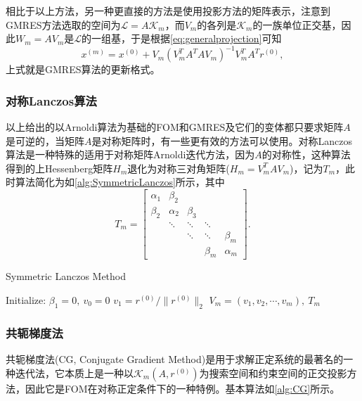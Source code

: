 \documentclass[a4paper,10pt]{ctexart}
\begin{document}
相比于以上方法，另一种更直接的方法是使用投影方法的矩阵表示，注意到GMRES方法选取的空间为$ \mathcal{L} = A \mathcal{K}_m $，而$ V_m $的各列是$ \mathcal{K}_m $的一族单位正交基，因此$ W_m = AV_m $是$ \mathcal{L} $的一组基，于是根据\ref{eq:generalprojection}可知
\begin{equation}
    x^{(m)} = x^{(0)} + V_m(V_m^TA^TAV_m)^{-1}V_m^TA^Tr^{(0)},
\end{equation}
上式就是GMRES算法的更新格式。

\subsubsection{对称Lanczos算法}
以上给出的以Arnoldi算法为基础的FOM和GMRES及它们的变体都只要求矩阵$ A $是可逆的，当矩阵$ A $是对称矩阵时，有一些更有效的方法可以使用。对称Lanczos算法是一种特殊的适用于对称矩阵Arnoldi迭代方法，因为$ A $的对称性，这种算法得到的上Hessenberg矩阵$ H_m $退化为对称三对角矩阵($ H_m = V^T_mAV_m $)，记为$ T_m $，此时算法简化为如\ref{alg:SymmetricLanczos}所示，其中
\[
    T_m = 
    \begin{bmatrix} 
        \alpha_1 & \beta_2 & & &\\
        \beta_2 & \alpha_2 & \beta_3 & &\\
        & \ddots & \ddots & \ddots &\\
        & & \ddots & \ddots & \beta_m\\
        & & & \beta_m & \alpha_m 
    \end{bmatrix}.
\]

\begin{algorithm}[htbp]
    \caption{Symmetric Lanczos Method}\label{alg:SymmetricLanczos}
    Initialize: $ \beta_1 = 0,\ v_0=0 $\;
    $ v_1 = r^{(0)} / \| r^{(0)} \|_2 $\;
    \Return $ V_m = (v_1,v_2,\cdots ,v_m),\ T_m $\;
\end{algorithm}

\subsubsection{共轭梯度法}
共轭梯度法(CG, Conjugate Gradient Method)是用于求解正定系统的最著名的一种迭代法，它本质上是一种以$ \mathcal{K}_m(A,r^{(0)}) $为搜索空间和约束空间的正交投影方法，因此它是FOM在对称正定条件下的一种特例。基本算法如\ref{alg:CG}所示。
\end{document}
